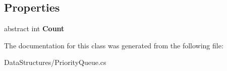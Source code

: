\subsection*{Properties}
\begin{DoxyCompactItemize}
\item 
\mbox{\label{class_data_structures_1_1_priority_queue_aec35247de1b30d371da5c9d3d2e01407}} 
abstract int {\bfseries Count}
\end{DoxyCompactItemize}


The documentation for this class was generated from the following file\+:\begin{DoxyCompactItemize}
\item 
Data\+Structures/Priority\+Queue.\+cs\end{DoxyCompactItemize}
